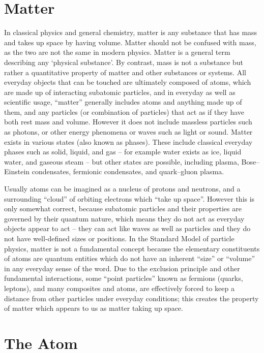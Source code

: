 \hypertarget{matter}{%
\section{Matter}\label{matter}}

In classical physics and general chemistry, matter is any substance that has mass and takes up space by having volume. Matter should not be confused with mass, as the two are not the same in modern physics. Matter is a general term describing any `physical substance'. By contrast, mass is not a substance but rather a quantitative property of matter and other substances or systems. All everyday objects that can be touched are ultimately composed of atoms, which are made up of interacting subatomic particles, and in everyday as well as scientific usage, ``matter'' generally includes atoms and anything made up of them, and any particles (or combination of particles) that act as if they have both rest mass and volume. However it does not include massless particles such as photons, or other energy phenomena or waves such as light or sound. Matter exists in various states (also known as phases). These include classical everyday phases such as solid, liquid, and gas -- for example water exists as ice, liquid water, and gaseous steam -- but other states are possible, including plasma, Bose--Einstein condensates, fermionic condensates, and quark--gluon plasma.

Usually atoms can be imagined as a nucleus of protons and neutrons, and a surrounding ``cloud'' of orbiting electrons which ``take up space''. However this is only somewhat correct, because subatomic particles and their properties are governed by their quantum nature, which means they do not act as everyday objects appear to act -- they can act like waves as well as particles and they do not have well-defined sizes or positions. In the Standard Model of particle physics, matter is not a fundamental concept because the elementary constituents of atoms are quantum entities which do not have an inherent ``size'' or ``volume'' in any everyday sense of the word. Due to the exclusion principle and other fundamental interactions, some ``point particles'' known as fermions (quarks, leptons), and many composites and atoms, are effectively forced to keep a distance from other particles under everyday conditions; this creates the property of matter which appears to us as matter taking up space.

\hypertarget{the-atom}{%
\section{The Atom}\label{the-atom}}


